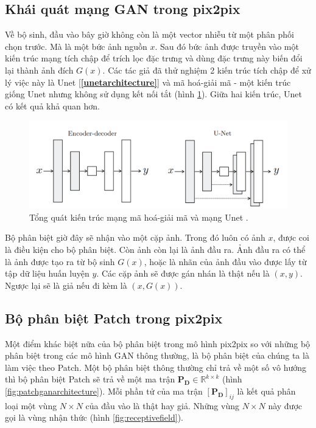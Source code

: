\documentclass[a4paper, 12pt]{report}
\begin{document}
\subsection{Khái quát mạng GAN trong pix2pix}\label{overviewofpix2pix}

Về bộ sinh, đầu vào bây giờ không còn là một vector nhiễu từ một phân phối chọn trước.
Mà là một bức ảnh nguồn $x$.
Sau đó bức ảnh được truyền vào một kiến trúc mạng tích chập để trích lọc đặc trưng và dùng đặc trưng này biến đổi lại thành ảnh đích $G(x)$.
Các tác giả đã thử nghiệm 2 kiến trúc tích chập để xử lý việc này là Unet [\textbf{\ref{unetarchitecture}}] và mã hoá-giải mã - một kiến trúc giống Unet nhưng không sử dụng kết nối tắt (hình \ref{fig:enc-decvsunet}).
Giữa hai kiến trúc, Unet có kết quả khả quan hơn.\vspace{5pt}

\begin{figure}[!h]
\captionsetup{width=0.8\textwidth}
\centering
\includegraphics[width=15cm]{images/3_2.PNG}
\caption{Tổng quát kiến trúc mạng mã hoá-giải mã và mạng Unet \cite{isola2018imagetoimage}.}
\label{fig:enc-decvsunet}
\end{figure}

Bộ phân biệt giờ đây sẽ nhận vào một cặp ảnh.
Trong đó luôn có ảnh $x$, được coi là điều kiện cho bộ phân biệt.
Còn ảnh còn lại là ảnh đầu ra.
Ảnh đầu ra có thể là ảnh được tạo ra từ bộ sinh $G(x)$, hoặc là nhãn của ảnh đầu vào được lấy từ tập dữ liệu huấn luyện $y$.
Các cặp ảnh sẽ được gán nhán là thật nếu là $(x, y)$.
Ngược lại sẽ là giả nếu đi kèm là $\left(x, G(x)\right)$.

\subsection{Bộ phân biệt Patch trong pix2pix}\label{patchdiscriminator}

Một điểm khác biệt nữa của bộ phân biệt trong mô hình pix2pix so với những bộ phân biệt trong các mô hình GAN thông thường, là bộ phân biệt của chúng ta là làm việc theo Patch.
Một bộ phân biệt thông thường chỉ trả về một số vô hướng thì bộ phân biệt Patch sẽ trả về một ma trận $\mathbf{P_D} \in \mathbb{R}^{k\times k}$ (hình \ref{fig:patchganarchitecture}).
Mỗi phần tử của ma trận $\left[\mathbf{P_D}\right]_{ij}$ là kết quả phân loại một vùng $N \times N$ của đầu vào là thật hay giả.
Những vùng $N \times N$ này được gọi là vùng nhận thức (hình \ref{fig:receptivefield}).\vspace{5pt}
\end{document}
